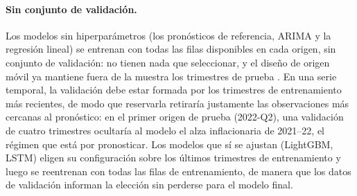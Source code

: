 \documentclass[12pt,letterpaper,oneside]{report}
\renewcommand{\_}{\UnderscoreOriginal\allowbreak}
\begin{document}
\paragraph{Sin conjunto de validación.} Los modelos sin hiperparámetros (los pronósticos de referencia, ARIMA y la regresión lineal) se entrenan con todas las filas disponibles en cada origen, sin conjunto de validación: no tienen nada que seleccionar, y el diseño de origen móvil ya mantiene fuera de la muestra los trimestres de prueba \parencite{hyndman2021fpp,tashman2000outofsample}. En una serie temporal, la validación debe estar formada por los trimestres de entrenamiento más recientes, de modo que reservarla retiraría justamente las observaciones más cercanas al pronóstico: en el primer origen de prueba (2022-Q2), una validación de cuatro trimestres ocultaría al modelo el alza inflacionaria de 2021--22, el régimen que está por pronosticar. Los modelos que sí se ajustan (LightGBM, LSTM) eligen su configuración sobre los últimos trimestres de entrenamiento y luego se reentrenan con todas las filas de entrenamiento, de manera que los datos de validación informan la elección sin perderse para el modelo final.
\end{document}
